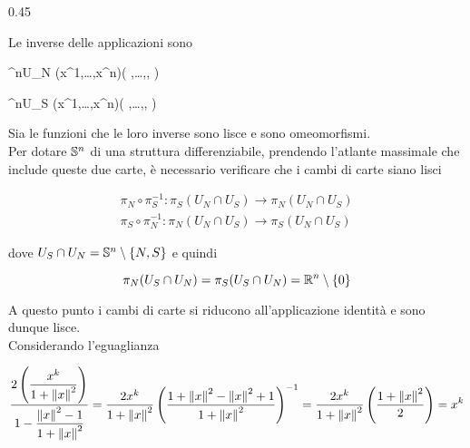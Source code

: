 	{0.45}{%
		}

Le inverse delle applicazioni sono

	{\R^{n}}{U_{N}}
	{(x^{1},\dots,x^{n})}{\left( ,\dots,, \right)}

	{\R^{n}}{U_{S}}
	{(x^{1},\dots,x^{n})}{\left( ,\dots,, \right)}

Sia le funzioni che le loro inverse sono lisce e sono omeomorfismi.\\
Per dotare $ \S^{n} $ di una struttura differenziabile, prendendo l'atlante massimale che include queste due carte, è necessario verificare che i cambi di carte siano lisci

\begin{gather}
	\pi_{N} \circ \pi_{S}^{-1} : \pi_{S}(U_{N} \cap U_{S}) \to \pi_{N}(U_{N} \cap U_{S})\\
	\pi_{S} \circ \pi_{N}^{-1} : \pi_{N}(U_{N} \cap U_{S}) \to \pi_{S}(U_{N} \cap U_{S})
\end{gather}

dove $ U_{S} \cap U_{N} = \S^{n} \setminus \{N,S\} $ e quindi

\begin{equation}
	\pi_{N}(U_{S} \cap U_{N}) = \pi_{S}(U_{S} \cap U_{N}) = \R^{n} \setminus \{0\}
\end{equation}

A questo punto i cambi di carte si riducono all'applicazione identità e sono dunque lisce.\\
Considerando l'eguaglianza

\begin{equation}
	\dfrac{ 2 \left( \dfrac{x^{k}}{1 + \norm{x}^{2}} \right) }{ 1 - \dfrac{\norm{x}^{2} - 1}{1 + \norm{x}^{2}} } = \dfrac{2 x^{k}}{1 + \norm{x}^{2}} \left( \dfrac{ 1 + \norm{x}^{2} - \norm{x}^{2} + 1 }{ 1 + \norm{x}^{2} } \right)^{-1} %
	= \dfrac{2 x^{k}}{1 + \norm{x}^{2}} \left( \dfrac{1 + \norm{x}^{2}}{2} \right) %
	= x^{k}
\end{equation}

